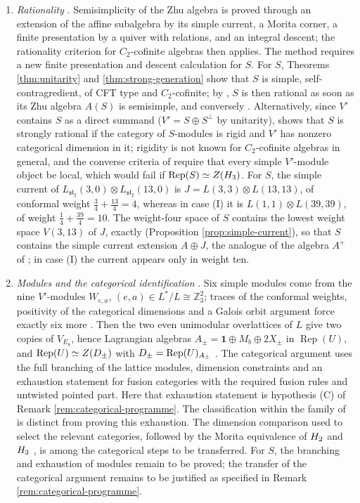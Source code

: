 \documentclass[leqno]{article}
\let\cal\relax
\newcommand{\cal}{\mathcal}
\newcommand{\Z}{\ensuremath{\mathbb{Z}}}
\newcommand{\ot}{\otimes}
\DeclareMathOperator{\Rep}{Rep}
\numberwithin{equation}{section}
\begin{document}
\begin{enumerate}
\item \emph{Rationality} \cite[Part III, pp.~25--55]{Rie26b}. Semisimplicity of the Zhu algebra is proved through an extension of the affine subalgebra by its simple current, a Morita corner, a finite presentation by a quiver with relations, and an integral descent; the rationality criterion for $C_2$-cofinite algebras then applies. The method requires a new finite presentation and descent calculation for $S$. For $S$, Theorems \ref{thm:unitarity} and \ref{thm:strong-generation} show that $S$ is simple, self-contragredient, of CFT type and $C_2$-cofinite; by \cite[Main Theorem 3 (Corollary 5.19)]{McR21}, $S$ is then rational as soon as its Zhu algebra $A(S)$ is semisimple, and conversely \cite{Zhu96}. Alternatively, since $V'$ contains $S$ as a direct summand ($V' = S \oplus S^\perp$ by unitarity), \cite{McR22} shows that $S$ is strongly rational if the category of $S$-modules is rigid and $V'$ has nonzero categorical dimension in it; rigidity is not known for $C_2$-cofinite algebras in general, and the converse criteria of \cite{CMSY25} require that every simple $V'$-module object be local, which would fail if $\Rep(S) \simeq Z(\cal H_3)$. For $S$, the simple current of $L_{\mathfrak{sl}_2}(3,0) \ot L_{\mathfrak{sl}_2}(13,0)$ is $J = L(3,3) \ot L(13,13)$, of conformal weight $\frac{3}{4} + \frac{13}{4} = 4$, whereas in case (I) it is $L(1,1) \ot L(39,39)$, of weight $\frac14 + \frac{39}{4} = 10$. The weight-four space of $S$ contains the lowest weight space $V(3,13)$ of $J$, exactly (Proposition \ref{prop:simple-current}), so that $S$ contains the simple current extension $A \oplus J$, the analogue of the algebra $A^+$ of \cite[Section 7]{Rie26b}; in case (I) the current appears only in weight ten.

\item \emph{Modules and the categorical identification} \cite[Parts IV--V, pp.~56--70]{Rie26b}. Six simple modules come from the nine $V'$-modules $W_{e,a}$, $(e,a) \in L^*/L \cong \Z_3^2$; traces of the conformal weights, positivity of the categorical dimensions and a Galois orbit argument force exactly six more \cite[Section 11]{Rie26b}. Then the two even unimodular overlattices of $L$ give two copies of $V_{E_8}$, hence Lagrangian algebras $A_\pm = \mathbf 1 \oplus M_b \oplus 2X_\pm$ in $\Rep(U)$, and $\Rep(U) \simeq Z(\cal D_\pm)$ with $\cal D_\pm = \Rep(U)_{A_\pm}$ \cite[Lemma 12.2]{Rie26b} \cite{DMNO13}. The categorical argument uses the full branching of the lattice modules, dimension constraints and an exhaustion statement for fusion categories with the required fusion rules and untwisted pointed part. Here that exhaustion statement is hypothesis (C) of Remark \ref{rem:categorical-programme}. The classification within the family of \cite[Theorems 2 and 3]{EvG17} is distinct from proving this exhaustion. The dimension comparison used to select the relevant categories, followed by the Morita equivalence of $\cal H_2$ and $\cal H_3$ \cite[Theorem 1.4]{GrS12}, is among the categorical steps to be transferred. For $S$, the branching and exhaustion of modules remain to be proved; the transfer of the categorical argument remains to be justified as specified in Remark \ref{rem:categorical-programme}.
\end{enumerate}
\end{document}
